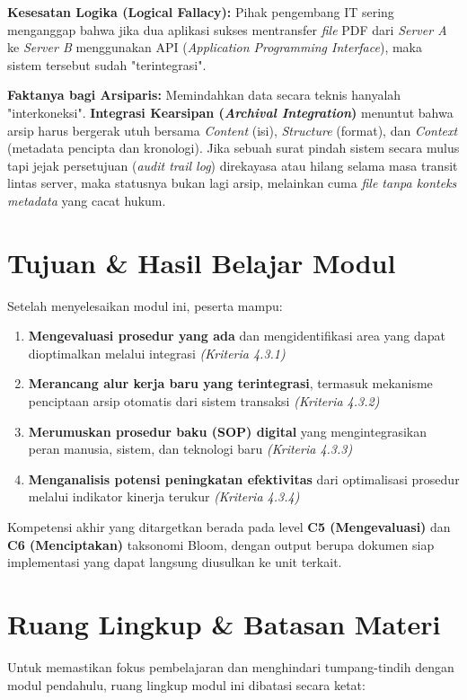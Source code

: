\documentclass[12pt,a4paper]{report}
\begin{document}
\begin{plnbox}
\small
\textbf{Kesesatan Logika (Logical Fallacy):} Pihak pengembang IT sering menganggap bahwa jika dua aplikasi sukses mentransfer \textit{file} PDF dari \textit{Server A} ke \textit{Server B} menggunakan API (\textit{Application Programming Interface}), maka sistem tersebut sudah "terintegrasi".

\textbf{Faktanya bagi Arsiparis:} Memindahkan data secara teknis hanyalah "interkoneksi". \textbf{Integrasi Kearsipan (\textit{Archival Integration})} menuntut bahwa arsip harus bergerak utuh bersama \textit{Content} (isi), \textit{Structure} (format), dan \textit{Context} (metadata pencipta dan kronologi). Jika sebuah surat pindah sistem secara mulus tapi jejak persetujuan (\textit{audit trail log}) direkayasa atau hilang selama masa transit lintas server, maka statusnya bukan lagi arsip, melainkan cuma \textit{file tanpa konteks metadata} yang cacat hukum. 
\end{plnbox}

\section{Tujuan \& Hasil Belajar Modul}
Setelah menyelesaikan modul ini, peserta mampu:
\begin{enumerate}[leftmargin=*, nosep]
    \item \textbf{Mengevaluasi prosedur yang ada} dan mengidentifikasi area yang dapat dioptimalkan melalui integrasi \textit{(Kriteria 4.3.1)}
    \item \textbf{Merancang alur kerja baru yang terintegrasi}, termasuk mekanisme penciptaan arsip otomatis dari sistem transaksi \textit{(Kriteria 4.3.2)}
    \item \textbf{Merumuskan prosedur baku (SOP) digital} yang mengintegrasikan peran manusia, sistem, dan teknologi baru \textit{(Kriteria 4.3.3)}
    \item \textbf{Menganalisis potensi peningkatan efektivitas} dari optimalisasi prosedur melalui indikator kinerja terukur \textit{(Kriteria 4.3.4)}
\end{enumerate}
Kompetensi akhir yang ditargetkan berada pada level \textbf{C5 (Mengevaluasi)} dan \textbf{C6 (Menciptakan)} taksonomi Bloom, dengan output berupa dokumen siap implementasi yang dapat langsung diusulkan ke unit terkait.

\section{Ruang Lingkup \& Batasan Materi}
Untuk memastikan fokus pembelajaran dan menghindari tumpang-tindih dengan modul pendahulu, ruang lingkup modul ini dibatasi secara ketat:
\end{document}
